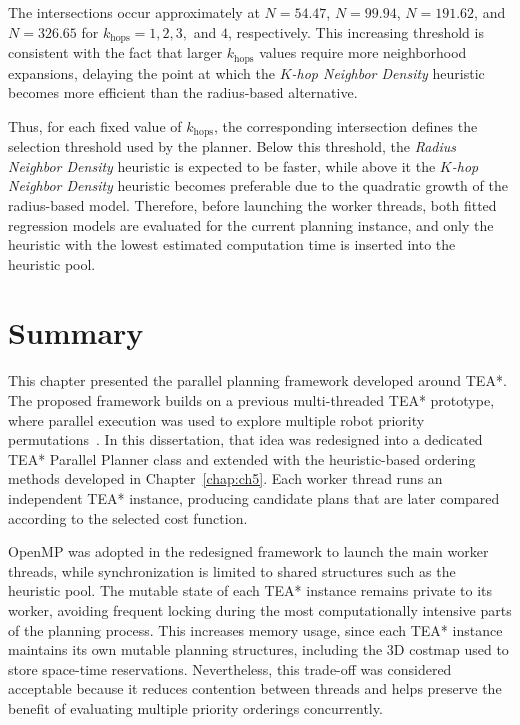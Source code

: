 The intersections occur approximately at \(N=54.47\), \(N=99.94\), \(N=191.62\), and
\(N=326.65\) for \(k_{\text{hops}}=1,2,3,\) and \(4\), respectively. This increasing threshold is
consistent with the fact that larger \(k_{\text{hops}}\) values require more neighborhood
expansions, delaying the point at which the \textit{\(K\)-hop Neighbor Density} heuristic becomes more
efficient than the radius-based alternative.

Thus, for each fixed value of \(k_{\text{hops}}\), the corresponding intersection defines the
selection threshold used by the planner. Below this threshold, the \textit{Radius Neighbor Density}
heuristic is expected to be faster, while above it the \textit{\(K\)-hop Neighbor Density} heuristic becomes
preferable due to the quadratic growth of the radius-based model. Therefore, before launching the
worker threads, both fitted regression models are evaluated for the current planning instance, and
only the heuristic with the lowest estimated computation time is inserted into the heuristic pool.


\section{Summary}
\label{sec:parallel_summary}
\hspace{\parindent}
This chapter presented the parallel planning framework developed around TEA*. The proposed
framework builds on a previous multi-threaded TEA* prototype, where parallel execution was used
to explore multiple robot priority permutations~\cite{ribeiro2025parallel}. In this dissertation, that
idea was redesigned into a dedicated TEA* Parallel Planner class and extended with the
heuristic-based ordering methods developed in Chapter~\ref{chap:ch5}. Each worker thread runs an
independent TEA* instance, producing candidate plans that are later compared according to the
selected cost function.

OpenMP was adopted in the redesigned framework to launch the main worker threads, while
synchronization is limited to shared structures such as the heuristic pool. The mutable state of each
TEA* instance remains private to its worker, avoiding frequent locking during the most
computationally intensive parts of the planning process. This increases memory usage, since each
TEA* instance maintains its own mutable planning structures, including the 3D costmap used to
store space-time reservations. Nevertheless, this trade-off was considered acceptable because it
reduces contention between threads and helps preserve the benefit of evaluating multiple priority
orderings concurrently.

